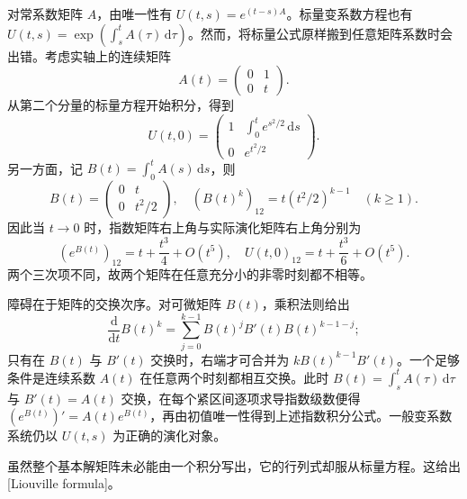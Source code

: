 \ProseParagraphBreak

对常系数矩阵 \(A\)，由唯一性有 \(U(t,s)=e^{(t-s)A}\)。标量变系数方程也有 \(U(t,s)=\exp(\int_s^t A(\tau)\,\mathrm d\tau)\)。然而，将标量公式原样搬到任意矩阵系数时会出错。考虑实轴上的连续矩阵
\[
 A(t)=\begin{pmatrix}0&1\\0&t\end{pmatrix}.
\]
从第二个分量的标量方程开始积分，得到
\[
 U(t,0)=\begin{pmatrix}
 1&\displaystyle\int_0^t e^{s^2/2}\,\mathrm ds\\[3pt]
 0&e^{t^2/2}
 \end{pmatrix}.
\]
另一方面，记 \(B(t)=\int_0^t A(s)\,\mathrm ds\)，则
\[
 B(t)=\begin{pmatrix}0&t\\0&t^2/2\end{pmatrix},\quad
 (B(t)^k)_{12}=t(t^2/2)^{k-1}\quad(k\geq1).
\]
因此当 \(t\to0\) 时，指数矩阵右上角与实际演化矩阵右上角分别为
\[
 (e^{B(t)})_{12}=t+\frac{t^3}{4}+O(t^5),\quad
 U(t,0)_{12}=t+\frac{t^3}{6}+O(t^5).
\]
两个三次项不同，故两个矩阵在任意充分小的非零时刻都不相等。

\ProseParagraphBreak

障碍在于矩阵的交换次序。对可微矩阵 \(B(t)\)，乘积法则给出
\[
 \frac{\mathrm d}{\mathrm dt}B(t)^k
 =\sum_{j=0}^{k-1}B(t)^jB'(t)B(t)^{k-1-j};
\]
只有在 \(B(t)\) 与 \(B'(t)\) 交换时，右端才可合并为 \(kB(t)^{k-1}B'(t)\)。一个足够条件是连续系数 \(A(t)\) 在任意两个时刻都相互交换。此时 \(B(t)=\int_s^t A(\tau)\,\mathrm d\tau\) 与 \(B'(t)=A(t)\) 交换，在每个紧区间逐项求导指数级数便得 \((e^{B(t)})'=A(t)e^{B(t)}\)，再由初值唯一性得到上述指数积分公式。一般变系数系统仍以 \(U(t,s)\) 为正确的演化对象。

\ProseParagraphBreak

虽然整个基本解矩阵未必能由一个积分写出，它的行列式却服从标量方程。这给出[Liouville formula]。

